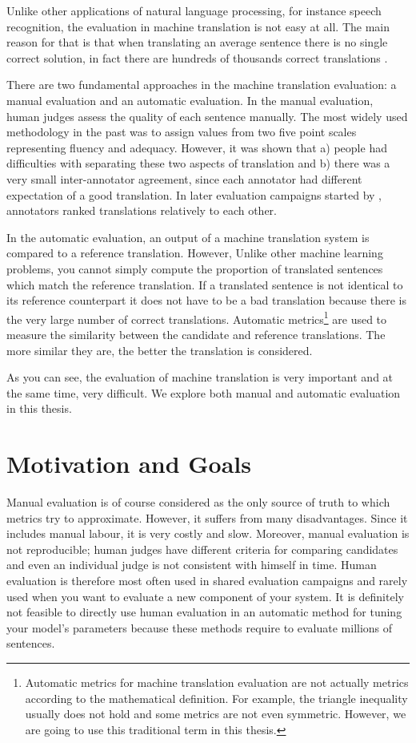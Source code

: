 Unlike other applications of natural language processing, for instance speech
recognition, the evaluation in machine translation is not easy at all. The main
reason for that is that when translating an average sentence there is no single
correct solution, in fact there are hundreds of thousands correct translations
.


There are two fundamental approaches in the machine translation evaluation: a
manual evaluation and an automatic evaluation.  In the manual evaluation, human
judges assess the quality of each sentence manually. The most widely used
methodology in the past was to assign values from two five point scales
representing fluency and adequacy. However, it was shown that a) people had
difficulties with separating these two aspects of translation and b) there was
a very small inter-annotator agreement, since each annotator had different
expectation of a good translation. In later evaluation campaigns started by
, annotators ranked translations relatively 
to each other.

In the automatic evaluation, an output of a machine translation system is
compared to a reference translation. However, Unlike other machine learning
problems, you cannot simply compute the proportion of translated sentences
which match the reference translation. If a translated sentence is not
identical to its reference counterpart it does not have to be a bad translation
because there is the very large number of correct translations. Automatic
metrics\footnote{Automatic metrics for machine translation evaluation are not
actually metrics according to the mathematical definition. For example, the
triangle inequality usually does not hold and some metrics are not even
symmetric. However, we are going to use this traditional term in this thesis.}
are used to measure the similarity between the candidate and reference
translations. The more similar they are, the better the translation is
considered.

As you can see, the evaluation of machine translation is very important and at
the same time, very difficult. We explore both manual and automatic evaluation
in this thesis.

\section{Motivation and Goals}

Manual evaluation is of course considered as the only source of truth to which
metrics try to approximate. However, it suffers from many disadvantages. Since
it includes manual labour, it is very costly and slow. Moreover, manual
evaluation is not reproducible; human judges have different criteria for
comparing candidates and even an individual judge is not consistent with
himself in time. Human evaluation is therefore most often used in shared
evaluation campaigns and rarely used when you want to evaluate a new component
of your system. It is definitely not feasible to directly use human evaluation
in an automatic method for tuning your model's parameters because these methods
require to evaluate millions of sentences.


